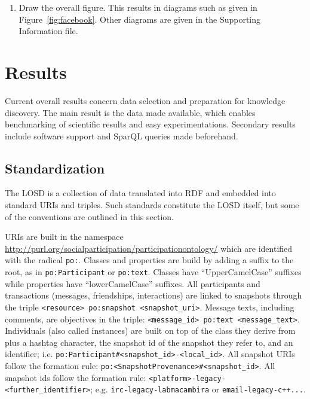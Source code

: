 \documentclass[review]{elsarticle}
\newcommand{\textttt}[1] {\texttt{\footnotesize#1}}
\begin{document}
\begin{enumerate}[leftmargin=0cm]
\item Draw the overall figure. This results in diagrams such as given in Figure~\ref{fig:facebook}.
	Other diagrams are given in the Supporting Information file.
\end{enumerate}
 
\section{Results}
\label{outline}
Current overall results concern data selection and preparation for knowledge discovery.
The main result is the data made available, which enables benchmarking of scientific results
and easy experimentations.
Secondary results include software support and SparQL queries made beforehand.

\subsection{Standardization}
The LOSD is a collection of data translated into RDF and embedded into standard URIs and triples.
Such standards constitute the LOSD itself, but some of the conventions are outlined in this section.

URIs are built in the namespace \url{http://purl.org/socialparticipation/participationontology/} which are identified with
the radical \textttt{po:}.
Classes and properties are build by adding a suffix to the root, as in \textttt{po:Participant} or \textttt{po:text}.
Classes have ``UpperCamelCase'' suffixes while properties have ``lowerCamelCase'' suffixes.
All participants and transactions (messages, friendships, interactions) are linked to
snapshots through the triple \textttt{<resource> po:snapshot <snapshot\_uri>}.
Message texts, including comments, are objectives in the triple: \textttt{<message\_id> po:text <message\_text>}.
Individuals (also called instances) are built on top of the class they derive from plus a hashtag character,
the snapshot id of the snapshot they refer to, and an identifier;
i.e. \textttt{po:Participant\#<snapshot\_id>-<local\_id>}.
All snapshot URIs follow the formation rule: \textttt{po:<SnapshotProvenance>\#<snapshot\_id>}.
All snapshot ids follow the formation rule: \textttt{<platform>-legacy-<further\_identifier>}; e.g.
\textttt{irc-legacy-labmacambira} or \textttt{email-legacy-c++...}.
\end{document}
